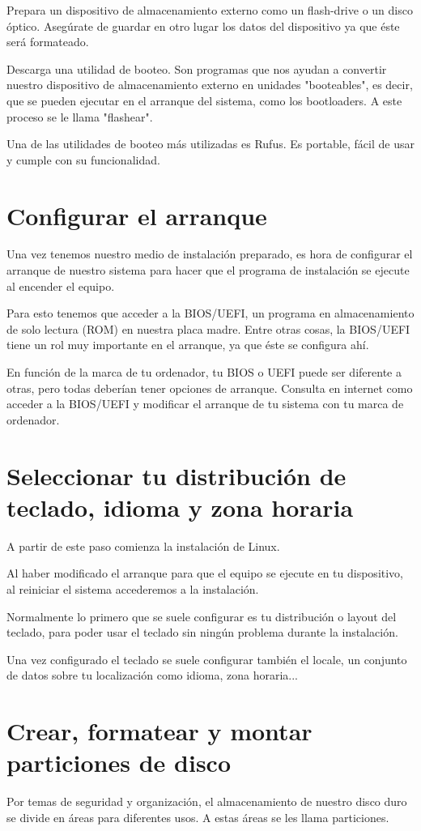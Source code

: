 Prepara un dispositivo de almacenamiento externo como un flash-drive o un disco óptico. Asegúrate de guardar en otro lugar los datos del dispositivo ya que éste será formateado.

Descarga una utilidad de booteo. Son programas que nos ayudan a convertir nuestro dispositivo de almacenamiento externo en unidades "booteables", es decir, que se pueden ejecutar en el arranque del sistema, como los bootloaders. A este proceso se le llama "flashear".

Una de las utilidades de booteo más utilizadas es Rufus. Es portable, fácil de usar y cumple con su funcionalidad.

\section{Configurar el arranque}
Una vez tenemos nuestro medio de instalación preparado, es hora de configurar el arranque de nuestro sistema para hacer que el programa de instalación se ejecute al encender el equipo.

Para esto tenemos que acceder a la BIOS/UEFI, un programa en almacenamiento de solo lectura (ROM) en nuestra placa madre. Entre otras cosas, la BIOS/UEFI tiene un rol muy importante en el arranque, ya que éste se configura ahí.

En función de la marca de tu ordenador, tu BIOS o UEFI puede ser diferente a otras, pero todas deberían tener opciones de arranque. Consulta en internet como acceder a la BIOS/UEFI y modificar el arranque de tu sistema con tu marca de ordenador.

\section{Seleccionar tu distribución de teclado, idioma y zona horaria}
A partir de este paso comienza la instalación de Linux.

Al haber modificado el arranque para que el equipo se ejecute en tu dispositivo, al reiniciar el sistema accederemos a la instalación.

Normalmente lo primero que se suele configurar es tu distribución o layout del teclado, para poder usar el teclado sin ningún problema durante la instalación.

Una vez configurado el teclado se suele configurar también el locale, un conjunto de datos sobre tu localización como idioma, zona horaria...

\section{Crear, formatear y montar particiones de disco}
Por temas de seguridad y organización, el almacenamiento de nuestro disco duro se divide en áreas para diferentes usos. A estas áreas se les llama particiones.


